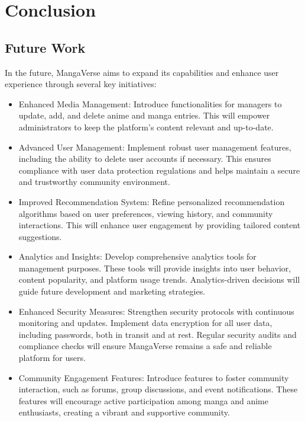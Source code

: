 \chapter{Conclusion}


\section{Future Work}

In the future, MangaVerse aims to expand its capabilities and enhance user experience through several key initiatives:

\begin{itemize}
\item Enhanced Media Management: Introduce functionalities for managers to update, add, and delete anime and manga entries. This will empower administrators to keep the platform's content relevant and up-to-date.

\item Advanced User Management: Implement robust user management features, including the ability to delete user accounts if necessary. This ensures compliance with user data protection regulations and helps maintain a secure and trustworthy community environment.

\item Improved Recommendation System: Refine personalized recommendation algorithms based on user preferences, viewing history, and community interactions. This will enhance user engagement by providing tailored content suggestions.

\item Analytics and Insights: Develop comprehensive analytics tools for management purposes. These tools will provide insights into user behavior, content popularity, and platform usage trends. Analytics-driven decisions will guide future development and marketing strategies.

\item Enhanced Security Measures: Strengthen security protocols with continuous monitoring and updates. Implement data encryption for all user data, including passwords, both in transit and at rest. Regular security audits and compliance checks will ensure MangaVerse remains a safe and reliable platform for users.

\item Community Engagement Features: Introduce features to foster community interaction, such as forums, group discussions, and event notifications. These features will encourage active participation among manga and anime enthusiasts, creating a vibrant and supportive community.
\end{itemize}

